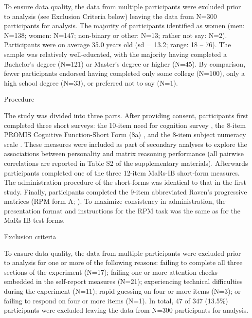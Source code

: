 \documentclass[a4paper,man,natbib]{apa6}
\makeatletter
\renewcommand{\subsubsection}{\@startsection{subsubsection}{3}
  {\z@}%
  {\b@level@two@skip}{\e@level@two@skip}%
  {\normalfont\normalsize\bfseries}}
\makeatother
\begin{document}
To ensure data quality, the data from multiple participants were excluded prior to analysis (see Exclusion Criteria below) leaving the data from N=300 participants for analysis. The majority of participants identified as women (men: N=138; women: N=147; non-binary or other: N=13; rather not say: N=2). Participants were on average 35.0 years old (sd = 13.2; range: 18 -- 76). The sample was relatively well-educated, with the majority having completed a Bachelor's degree (N=121) or Master's degree or higher (N=45). By comparison, fewer participants endorsed having completed only some college (N=100), only a high school degree (N=33), or preferred not to say (N=1). 

\subsubsection{Procedure}

The study was divided into three parts. After providing consent, participants first completed three short surveys: the 10-item need for cognition survey \citep{chiesi2018applying}, the 8-item PROMIS Cognitive Function-Short Form (8a) \citep{iverson2021normative}, and the 8-item subject numeracy scale \citep{fagerlin2007measuring}. These measures were included as part of secondary analyses  to explore the associations between personality and matrix reasoning performance (all pairwise correlations are reported in Table S2 of the supplementary materials). Afterwards participants completed one of the three 12-item MaRs-IB short-form measures. The administration procedure of the short-forms was identical to that in the first study. Finally, participants completed the 9-item abbreviated Raven's progressive matrices (RPM form A; \citealt{bilker2012development}). To maximize consistency in administration, the presentation format and instructions for the RPM task was the same as for the MaRs-IB test forms.

\subsubsection{Exclusion criteria}

To ensure data quality, the data from multiple participants were excluded prior to analysis for one or more of the following reasons: failing to complete all three sections of the experiment (N=17); failing one or more attention checks \citep{zorowitz2021inattentive} embedded in the self-report measures (N=21); experiencing technical difficulties during the experiment (N=11); rapid guessing on four or more items (N=3); or failing to respond on four or more items (N=1). In total, 47 of 347 (13.5\%) participants were excluded leaving the data from N=300 participants for analysis.
\end{document}
